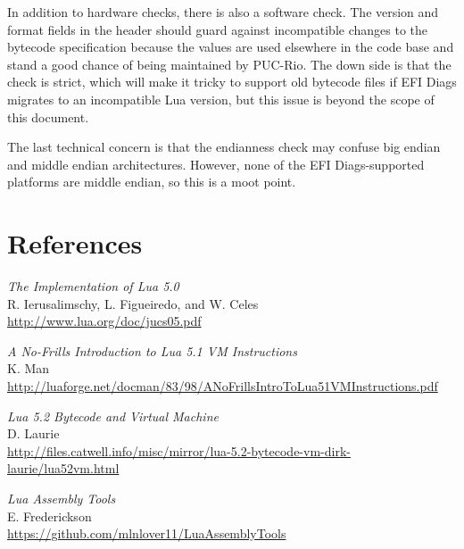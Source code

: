 	In addition to hardware checks, there is also a software check.  The
	version and format fields in the header should guard against
	incompatible changes to the bytecode specification because the values
	are used elsewhere in the code base and stand a good chance of being
	maintained by PUC-Rio.  The down side is that the check is strict,
	which will make it tricky to support old bytecode files if EFI Diags
	migrates to an incompatible Lua version, but this issue is beyond the
	scope of this document.

	The last technical concern is that the endianness check may confuse big
	endian and middle endian architectures.  However, none of the EFI
	Diags-supported platforms are middle endian, so this is a moot point.


\section{References}
\label{sec:References}

	\emph{The Implementation of Lua 5.0} \\
	R. Ierusalimschy, L. Figueiredo, and W. Celes \\
	\url{http://www.lua.org/doc/jucs05.pdf}

	\emph{A No-Frills Introduction to Lua 5.1 VM Instructions} \\
	K. Man \\
	\url{http://luaforge.net/docman/83/98/ANoFrillsIntroToLua51VMInstructions.pdf}

	\emph{Lua 5.2 Bytecode and Virtual Machine} \\
	D. Laurie \\
	\url{http://files.catwell.info/misc/mirror/lua-5.2-bytecode-vm-dirk-laurie/lua52vm.html}

	\emph{Lua Assembly Tools} \\
	E. Frederickson \\
	\url{https://github.com/mlnlover11/LuaAssemblyTools}
